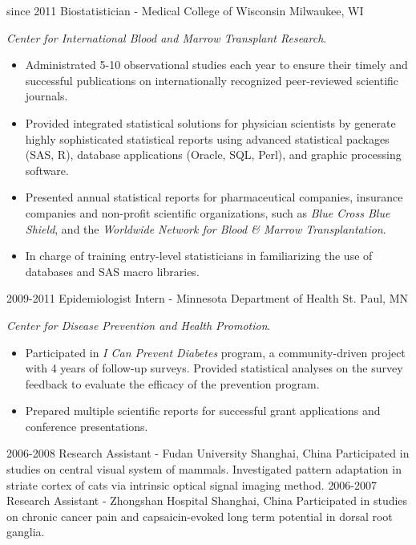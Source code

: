 \documentclass[10pt, print]{friggeri-cv}
\begin{document}
\begin{entrylist}
  \entry
    {since 2011}
    {Biostatistician - Medical College of Wisconsin}
    {Milwaukee, WI}
    {
    \textit{Center for International Blood and Marrow Transplant Research}.
    \begin{itemize}
      \item Administrated 5-10 observational studies each year to ensure their timely and successful publications on internationally recognized peer-reviewed scientific journals.
      \item Provided integrated statistical solutions for physician scientists by generate highly sophisticated statistical reports using advanced statistical packages (SAS, R), database applications (Oracle, SQL, Perl), and graphic processing software.
      \item Presented annual statistical reports for pharmaceutical companies, insurance companies and non-profit scientific organizations, such as \textit{Blue Cross Blue Shield}, and the \textit{Worldwide Network for Blood \& Marrow Transplantation}.
      \item In charge of training entry-level statisticians in familiarizing the use of databases and SAS macro libraries.
    \end{itemize}
    }
  \entry
    {2009-2011}
    {Epidemiologist Intern - Minnesota Department of Health}
    {St. Paul, MN}
    {
    \textit{Center for Disease Prevention and Health Promotion}.
    \begin{itemize}
      \item Participated in \textit{I Can Prevent Diabetes} program, a community-driven project with 4 years of follow-up surveys. Provided statistical analyses on the survey feedback to evaluate the efficacy of the prevention program.
      \item Prepared multiple scientific reports for successful grant applications and conference presentations.
    \end{itemize}
    }
  \entry
    {2006-2008}
    {Research Assistant - Fudan University}
    {Shanghai, China}
    {Participated in studies on central visual system of mammals. Investigated pattern adaptation in striate cortex of cats via intrinsic optical signal imaging method.}
  \entry
    {2006-2007}
    {Research Assistant - Zhongshan Hospital}
    {Shanghai, China }
    {Participated in studies on chronic cancer pain and capsaicin-evoked long term potential in dorsal root ganglia.}
\end{entrylist}
\end{document}
